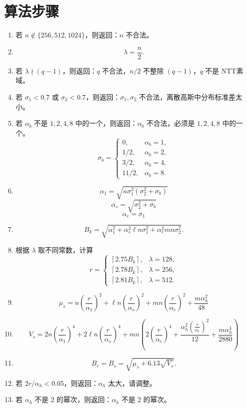 \documentclass[11pt]{article}
\newcommand{\zh}[1]{{\zhfont #1}}
\begin{document}
\section*{\zh{算法步骤}}
\begin{enumerate}
  \item {\zhfont 若 $n\notin\{256,512,1024\}$，则返回：$n$ 不合法。}
  \item \[
    \lambda = \frac{n}{2}.
  \]
  \item {\zhfont 若 $\lambda\nmid(q-1)$，则返回：$q$ 不合法，$n/2$ 不整除 $(q-1)$，$q$ 不是 }NTT{\zhfont 素域。}
  \item {\zhfont 若 $\sigma_1<0.7$ 或 $\sigma_2<0.7$，则返回：$\sigma_1,\sigma_2$ 不合法，离散高斯中分布标准差太小。}
  
  \item {\zhfont 若 $\alpha_b$ 不是 $1,2,4,8$ 中的一个，则返回：$\alpha_b$ 不合法，必须是 $1,2,4,8$ 中的一个。}
  \[
    \sigma_b =
    \begin{cases}
      0, & \alpha_b = 1,\\[0.3em]
      1/2, & \alpha_b = 2,\\[0.3em]
      3/2, & \alpha_b = 4,\\[0.3em]
      11/2, & \alpha_b = 8.
    \end{cases}
  \]

  \item
  \[
    \alpha_1 = \sqrt{n\sigma_1^2(\sigma_2^2+\sigma_b)} 
  \]
  \[
    \alpha_s =  \sqrt{\sigma_2^2+\sigma_b} 
  \]
  \[
    \alpha_e =  \sigma_1 
  \]


  \item \[
    B_k = \sqrt{\alpha_1^2 + \alpha_s^2 \ell n\sigma_1^2 + \alpha_e^2 mn\sigma_2^2}.
  \]
  \item {\zhfont 根据 $\lambda$ 取不同常数，计算}
  \[
    r=
    \begin{cases}
      \left\lceil 2.75B_k\right\rceil, & \lambda=128,\\[0.5em]
      \left\lceil 2.78B_k\right\rceil, & \lambda=256,\\[0.5em]
      \left\lceil 2.81B_k\right\rceil, & \lambda=512.
    \end{cases}
  \]
  \item \[
\mu_s = n (\frac{r}{\alpha_1})^2 + \ell n (\frac{r}{\alpha_s})^2 + mn(\frac{r}{\alpha_e})^2 + \frac{m \alpha_h^2}{48}
\]

  \item 
\[
V_s = 2n (\frac{r}{\alpha_1})^4 + 2\ell n (\frac{r}{\alpha_s})^4 + mn(2(\frac{r}{\alpha_e})^4 + \frac{\alpha_h^2  (\frac{r}{\alpha_e})^2}{12} +\frac{m \alpha_h^4}{2880})
\]


  \item \[
    B_v= B_s = \sqrt{\mu_s + 6.13\sqrt{V_s}}.
  \]

  \item {\zhfont 若 $2r/\alpha_h < 0.05$，则返回：$\alpha_h$ 太大，请调整。}
  \item {\zhfont 若 $\alpha_h$ 不是 $2$ 的幂次，则返回：$\alpha_h$ 不是 $2$ 的幂次。}
\end{enumerate}
\end{document}
